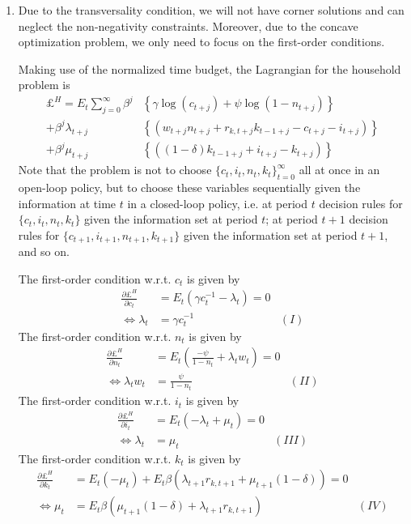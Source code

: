 \begin{enumerate}

\item Due to the transversality condition,
  we will not have corner solutions and can neglect the non-negativity constraints.
Moreover, due to the concave optimization problem, we only need to focus on the first-order conditions.

Making use of the normalized time budget, the Lagrangian for the household problem is
\begin{align*}
\pounds^H = E_t\sum_{j=0}^{\infty}\beta^j&\left\{\gamma \log(c_{t+j}) + \psi \log(1-n_{t+j}) \right\}
\\
+\beta^j \lambda_{t+j} &\left\{ \left(w_{t+j} n_{t+j} + r_{k,t+j} k_{t-1+j} - c_{t+j} - i_{t+j}\right) \right\}
\\
+\beta^j \mu_{t+j} &\left\{ \left((1-\delta)k_{t-1+j} + i_{t+j} - k_{t+j}\right)\right\}
\end{align*}
Note that the problem is not to choose $\{c_t,i_t,n_t,k_{t}\}_{t=0}^\infty$ all at once in an open-loop policy,
  but to choose these variables sequentially given the information at time $t$ in a closed-loop policy,
  i.e. at period $t$ decision rules for $\{c_t,i_t,n_t,k_{t}\}$ given the information set at period $t$;
  at period $t+1$ decision rules for $\{c_{t+1},i_{t+1},n_{t+1},k_{t+1}\}$ given the information set at period $t+1$,
  and so on.

The first-order condition w.r.t. $c_t$ is given by
\begin{align*}
\frac{\partial \pounds^H}{\partial c_{t}} &= E_t \left(\gamma c_t^{-1}-\lambda_{t}\right) = 0
\\
\Leftrightarrow \lambda_{t} &= \gamma c_{t}^{-1} & (I)
\end{align*}
The first-order condition w.r.t. $n_t$ is given by
\begin{align*}
\frac{\partial \pounds^H}{\partial n_{t}} &= E_t \left(\frac{-\psi}{1-n_{t}} + \lambda_{t} w_{t}\right) = 0
\\
\Leftrightarrow \lambda_{t} w_{t} &= \frac{\psi}{1-n_{t}} &(II)
\end{align*}
The first-order condition w.r.t. $i_{t}$ is given by
\begin{align*}
\frac{\partial \pounds^H}{\partial i_{t}} &= E_t \left(-\lambda_{t} + \mu_{t}\right) = 0
\\
\Leftrightarrow \lambda_{t} &= \mu_{t} & (III)
\end{align*}
The first-order condition w.r.t. $k_{t}$ is given by
\begin{align*}
\frac{\partial \pounds^H}{\partial k_{t}} &= E_t (-\mu_{t}) + 
	E_t \beta \left(\lambda_{t+1} r_{k,t+1} + \mu_{t+1}(1-\delta)\right) = 0
\\
\Leftrightarrow \mu_{t} &= E_t \beta(\mu_{t+1}(1-\delta) + \lambda_{t+1} r_{k,t+1}) & (IV)
\end{align*}


\end{enumerate}
